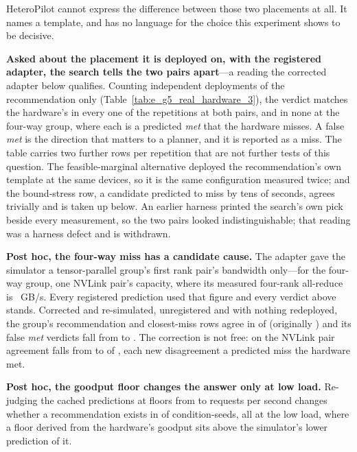 HeteroPilot cannot express the difference between those two
placements at all. It names a template, and has no language for the choice
this experiment shows to be decisive.



\textbf{Asked about the placement it is deployed on, with the registered
adapter, the search tells the two pairs apart}---a reading the corrected
adapter below qualifies. Counting independent deployments of the recommendation only
(Table~\ref{tab:e_g5_real_hardware_3}), the verdict matches the hardware's in every one of the \egfiveReps{} repetitions at
both pairs, and in none at the four-way group, where each is a predicted
\emph{met} that the hardware misses. A false \emph{met} is the direction that
matters to a planner, and it is reported as a miss. The table carries two
further rows per repetition that are not further tests of this question. The
feasible-marginal alternative deployed the recommendation's own template at
the same devices, so it is the same configuration measured twice; and the
bound-stress row, a candidate predicted to miss by tens of seconds, agrees
trivially and is taken up below. An earlier harness printed the search's own pick beside every
measurement, so the two pairs looked indistinguishable; that reading was a
harness defect and is withdrawn.

\textbf{Post hoc, the four-way miss has a candidate cause.} The adapter gave
the simulator a tensor-parallel group's first rank pair's bandwidth only---for
the four-way group, one NVLink pair's capacity, where its measured four-rank
all-reduce is \egfourBusbwFour~GB/s. Every registered prediction used that
figure and every verdict above stands. Corrected and re-simulated, unregistered
and with nothing redeployed, the group's recommendation and closest-miss rows
agree in \egfivePostTthreeReAgree{} of \egfivePostTthreeRows{} (originally
\egfivePostTthreeOrigAgree{}) and its false \emph{met} verdicts fall from
\egfivePostTthreeOrigFp{} to \egfivePostTthreeReFp. The correction is not
free: on the NVLink pair agreement falls from \egfivePostToneOrigAgree{} to
\egfivePostToneReAgree{} of \egfivePostToneRows{}, each new disagreement a
predicted miss the hardware met.

\textbf{Post hoc, the goodput floor changes the answer only at low load.}
Re-judging the cached predictions at floors from \egfiveFloorLow{} to
\egfiveFloorHigh{} requests per second changes whether a recommendation exists
in \egfiveFloorChanged{} of \egfiveFloorRows{} condition-seeds, all at the low
load, where a floor derived from the hardware's goodput sits above the
simulator's lower prediction of it.

